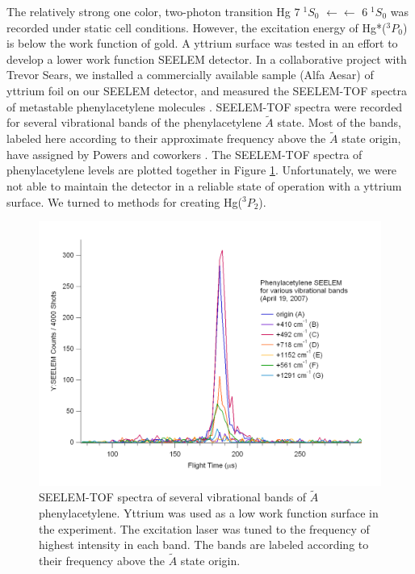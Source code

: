 The relatively strong one color, two-photon transition Hg $7 \; ^1S_0$
$\leftarrow\leftarrow$ $6 \; ^1S_0$ was recorded under static cell
conditions.  However, the excitation energy of Hg*($^3P_0$) is below
the work function of gold.  A yttrium surface was tested in an effort
to develop a lower work function SEELEM detector.  In a collaborative
project with Trevor Sears, we installed a commercially available
sample (Alfa Aesar) of yttrium foil on our SEELEM detector, and
measured the SEELEM-TOF spectra of metastable phenylacetylene
molecules \cite{hofstein08}.  SEELEM-TOF spectra were recorded for
several vibrational bands of the phenylacetylene $\tilde{A}$ state.
Most of the bands, labeled here according to their approximate
frequency above the $\tilde{A}$ state origin, have assigned by Powers
and coworkers \cite{powers81}.  The SEELEM-TOF spectra of
phenylacetylene levels are plotted together in Figure
\ref{fig:phenylacetylene-tofs}.  Unfortunately, we were not able to
maintain the detector in a reliable state of operation with a yttrium
surface.  We turned to methods for creating Hg($^3P_2$).

\begin{figure}
  \caption{SEELEM-TOF spectra of several vibrational bands of
    $\tilde{A}$ phenylacetylene.  Yttrium was used as a low work
    function surface in the experiment.  The excitation laser was
    tuned to the frequency of highest intensity in each band.  The
    bands are labeled according to their frequency above the
    $\tilde{A}$ state origin.}
  \label{fig:phenylacetylene-tofs}
  \centering
  \includegraphics[width=8in,angle=90]{phenylacetylene-tofs.pdf}
\end{figure}

